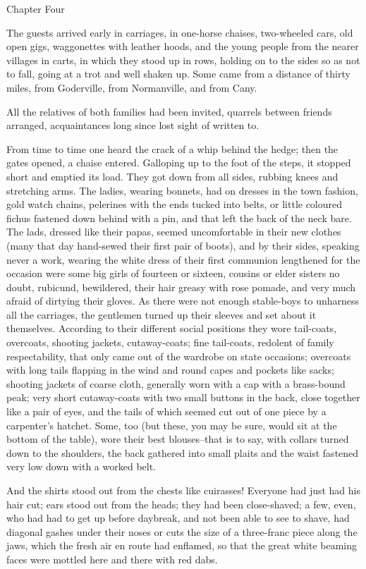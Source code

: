 \documentclass[11pt,twocolumn]{ltugboat}
\begin{document}
Chapter Four

The guests arrived early in carriages, in one-horse chaises, two-wheeled
cars, old open gigs, waggonettes with leather hoods, and the young
people from the nearer villages in carts, in which they stood up in
rows, holding on to the sides so as not to fall, going at a trot
and well shaken up. Some came from a distance of thirty miles, from
Goderville, from Normanville, and from Cany.

All the relatives of both families had been invited, quarrels between
friends arranged, acquaintances long since lost sight of written to.

From time to time one heard the crack of a whip behind the hedge; then
the gates opened, a chaise entered. Galloping up to the foot of the
steps, it stopped short and emptied its load. They got down from all
sides, rubbing knees and stretching arms. The ladies, wearing bonnets,
had on dresses in the town fashion, gold watch chains, pelerines with
the ends tucked into belts, or little coloured fichus fastened down
behind with a pin, and that left the back of the neck bare. The lads,
dressed like their papas, seemed uncomfortable in their new clothes
(many that day hand-sewed their first pair of boots), and by their
sides, speaking never a work, wearing the white dress of their first
communion lengthened for the occasion were some big girls of fourteen or
sixteen, cousins or elder sisters no doubt, rubicund, bewildered, their
hair greasy with rose pomade, and very much afraid of dirtying their
gloves. As there were not enough stable-boys to unharness all the
carriages, the gentlemen turned up their sleeves and set about it
themselves. According to their different social positions they wore
tail-coats, overcoats, shooting jackets, cutaway-coats; fine tail-coats,
redolent of family respectability, that only came out of the wardrobe
on state occasions; overcoats with long tails flapping in the wind and
round capes and pockets like sacks; shooting jackets of coarse
cloth, generally worn with a cap with a brass-bound peak; very short
cutaway-coats with two small buttons in the back, close together like
a pair of eyes, and the tails of which seemed cut out of one piece by a
carpenter's hatchet. Some, too (but these, you may be sure, would sit at
the bottom of the table), wore their best blouses--that is to say,
with collars turned down to the shoulders, the back gathered into small
plaits and the waist fastened very low down with a worked belt.

And the shirts stood out from the chests like cuirasses! Everyone had
just had his hair cut; ears stood out from the heads; they had been
close-shaved; a few, even, who had had to get up before daybreak, and
not been able to see to shave, had diagonal gashes under their noses or
cuts the size of a three-franc piece along the jaws, which the fresh
air en route had enflamed, so that the great white beaming faces were
mottled here and there with red dabs.
\end{document}
